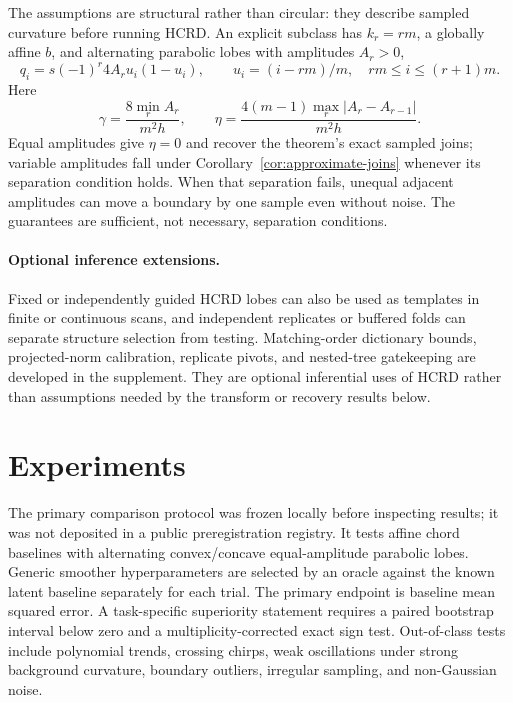 \documentclass[review,onefignum,onetabnum]{siamonline250211}
\begin{document}
The assumptions are structural rather than circular: they describe sampled
curvature before running HCRD.  An explicit subclass has $k_r=rm$, a globally
affine $b$, and alternating parabolic lobes with amplitudes $A_r>0$,
\begin{equation}
 q_i=s(-1)^r4A_r u_i(1-u_i),\qquad
 u_i=(i-rm)/m,\quad rm\le i\le(r+1)m.
\end{equation}
Here
\begin{equation}
 \gamma=\frac{8\min_r A_r}{m^2h},\qquad
 \eta=\frac{4(m-1)\max_r|A_r-A_{r-1}|}{m^2h}.
\end{equation}
Equal amplitudes give $\eta=0$ and recover the theorem's exact sampled joins;
variable amplitudes fall under Corollary~\ref{cor:approximate-joins} whenever
its separation condition holds.  When that separation fails, unequal adjacent
amplitudes can move a boundary by one sample even without noise.  The
guarantees are sufficient, not necessary, separation conditions.


\paragraph{Optional inference extensions.}
Fixed or independently guided HCRD lobes can also be used as templates in
finite or continuous scans, and independent replicates or buffered folds can
separate structure selection from testing.  Matching-order dictionary bounds,
projected-norm calibration, replicate pivots, and nested-tree gatekeeping are
developed in the supplement.  They are optional inferential uses of HCRD rather
than assumptions needed by the transform or recovery results below.

\section{Experiments}
The primary comparison protocol was frozen locally before inspecting results;
it was not deposited in a public preregistration registry.  It tests
affine chord baselines with alternating convex/concave equal-amplitude parabolic lobes.
Generic smoother hyperparameters are selected by an oracle against the known
latent baseline separately for each trial.  The primary endpoint is baseline
mean squared error.  A task-specific superiority statement requires
a paired bootstrap interval below zero and a multiplicity-corrected exact sign
test.  Out-of-class tests include polynomial trends, crossing chirps, weak
oscillations under strong background curvature, boundary outliers, irregular
sampling, and non-Gaussian noise.
\end{document}

